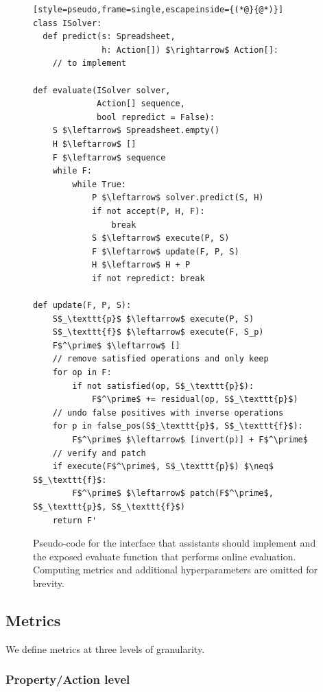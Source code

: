 \documentclass{article}
\theoremstyle{plain}
\theoremstyle{definition}
\theoremstyle{remark}
\begin{document}
\begin{figure}[htb]
\begin{lstlisting}[style=pseudo,frame=single,escapeinside={(*@}{@*)}]
class ISolver:
  def predict(s: Spreadsheet,
              h: Action[]) $\rightarrow$ Action[]:
    // to implement

def evaluate(ISolver solver,
             Action[] sequence,
             bool repredict = False):
    S $\leftarrow$ Spreadsheet.empty()
    H $\leftarrow$ []
    F $\leftarrow$ sequence
    while F:
        while True:
            P $\leftarrow$ solver.predict(S, H)
            if not accept(P, H, F):
                break
            S $\leftarrow$ execute(P, S)
            F $\leftarrow$ update(F, P, S)
            H $\leftarrow$ H + P
            if not repredict: break

def update(F, P, S):
    S$_\texttt{p}$ $\leftarrow$ execute(P, S)
    S$_\texttt{f}$ $\leftarrow$ execute(F, S_p)
    F$^\prime$ $\leftarrow$ []
    // remove satisfied operations and only keep
    for op in F:
        if not satisfied(op, S$_\texttt{p}$):
            F$^\prime$ += residual(op, S$_\texttt{p}$)
    // undo false positives with inverse operations
    for p in false_pos(S$_\texttt{p}$, S$_\texttt{f}$):
        F$^\prime$ $\leftarrow$ [invert(p)] + F$^\prime$
    // verify and patch
    if execute(F$^\prime$, S$_\texttt{p}$) $\neq$ S$_\texttt{f}$:
        F$^\prime$ $\leftarrow$ patch(F$^\prime$, S$_\texttt{p}$, S$_\texttt{f}$)
    return F'
\end{lstlisting}
\caption{Pseudo-code for the interface that assistants should implement and the exposed evaluate function that performs online evaluation. Computing metrics and additional hyperparameters are omitted for brevity.}
\label{alg:evaluation}
\end{figure}













\subsection{Metrics}
\label{sec:metrics}

We define metrics at three levels of granularity.

\subsubsection{Property/Action level}
\end{document}
